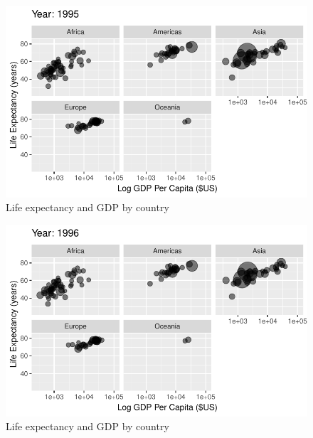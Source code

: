 \documentclass[
  letterpaper,
  DIV=11,
  numbers=noendperiod]{scrreport}
\theoremstyle{definition}
\theoremstyle{remark}
\begin{document}
\begin{figure}

{\centering \includegraphics{index_files/figure-pdf/fig-anim-lifegdp-79.pdf}

}

\caption{\label{fig-anim-lifegdp-79}Life expectancy and GDP by country}

\end{figure}

\begin{figure}

{\centering \includegraphics{index_files/figure-pdf/fig-anim-lifegdp-80.pdf}

}

\caption{\label{fig-anim-lifegdp-80}Life expectancy and GDP by country}

\end{figure}
\end{document}
